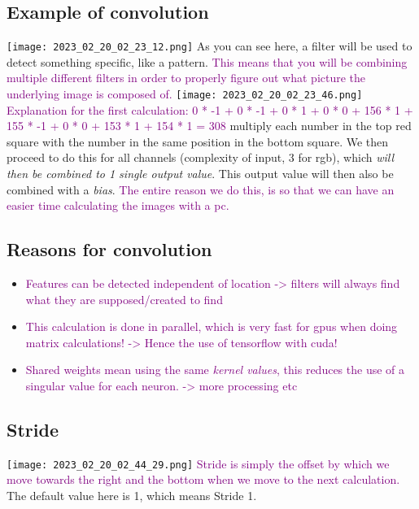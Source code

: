 \documentclass[main.tex,fontsize=8pt,paper=a4,paper=portrait,DIV=calc,]{scrartcl}
\begin{document}
\subsection{Example of convolution}
\texttt{[image: 2023\_02\_20\_02\_23\_12.png]}\newline
As you can see here, a filter will be used to detect something specific, like a pattern.\newline
\textcolor{purple}{This means that you will be combining multiple different filters in order to properly figure out what picture the underlying image is composed of.}\newline
\texttt{[image: 2023\_02\_20\_02\_23\_46.png]}\newline
\textcolor{purple}{Explanation for the first calculation: 0 * -1 + 0 * -1 + 0 * 1 + 0 * 0 + 156 * 1 + 155 * -1 + 0 * 0 + 153 * 1 + 154 * 1 = 308}\newline
multiply each number in the top red square with the number in the same position in the bottom square.
We then proceed to do this for all channels (complexity of input, 3 for rgb), which \emph{will then be combined to 1 single output value}.\newline
This output value will then also be combined with a \emph{bias}.\newline
\textcolor{purple}{The entire reason we do this, is so that we can have an easier time calculating the images with a pc.}

\subsection{Reasons for convolution}
\begin{itemize}
\item \textcolor{purple}{Features can be detected independent of location -> filters will always find what they are supposed/created to find}
\item \textcolor{purple}{This calculation is done in parallel, which is very fast for gpus when doing matrix calculations! -> Hence the use of tensorflow with cuda!}
\item \textcolor{purple}{Shared weights mean using the same \emph{kernel values}, this reduces the use of a singular value for each neuron. -> more processing etc}
\end{itemize} 

\subsection{Stride}
\texttt{[image: 2023\_02\_20\_02\_44\_29.png]}\newline
\textcolor{purple}{Stride is simply the offset by which we move towards the right and the bottom when we move to the next calculation.}\newline
The default value here is 1, which means Stride 1.
\end{document}
